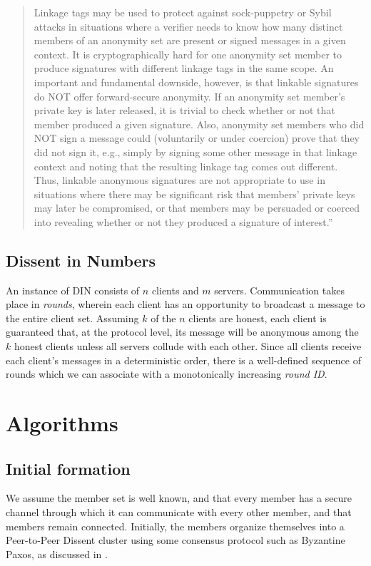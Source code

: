 \begin{quote}
Linkage tags may be used to protect against sock-puppetry or Sybil attacks in
situations where a verifier needs to know how many distinct members of an
anonymity set are present or signed messages in a given context. It is
cryptographically hard for one anonymity set member to produce signatures with
different linkage tags in the same scope. An important and fundamental downside,
however, is that linkable signatures do NOT offer forward-secure anonymity. If
an anonymity set member's private key is later released, it is trivial to check
whether or not that member produced a given signature. Also, anonymity set
members who did NOT sign a message could (voluntarily or under coercion) prove
that they did not sign it, e.g., simply by signing some other message in that
linkage context and noting that the resulting linkage tag comes out different.
Thus, linkable anonymous signatures are not appropriate to use in situations
where there may be significant risk that members' private keys may later be
compromised, or that members may be persuaded or coerced into revealing whether
or not they produced a signature of interest.''
\end{quote}
\cite{golrs}
\subsection{Dissent in Numbers}
An instance of DIN consists of $n$ clients and $m$ servers. Communication takes
place in \emph{rounds}, wherein each client has an opportunity to broadcast a
message to the entire client set. Assuming $k$ of the $n$ clients are honest,
each client is guaranteed that, at the protocol level, its message will be
anonymous among the $k$ honest clients unless all servers collude with each
other. Since all clients receive each client's
messages in a deterministic order, there is a well-defined sequence of rounds
which we can associate with a monotonically increasing \emph{round ID}.

\section{Algorithms}
\subsection{Initial formation}
We assume the member set is well known, and that every member has a secure
channel through which it can communicate with every other member, and that
members remain connected. Initially, the
members organize themselves into a Peer-to-Peer Dissent
cluster \cite{p2pd} using some consensus protocol such
as Byzantine Paxos, as discussed in \cite{sec}.

